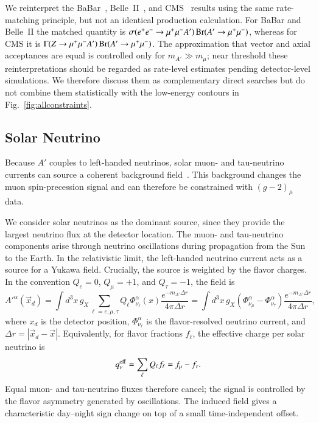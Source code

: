 \documentclass[onecolumn, aps, nofootinbib, prd, preprint, floats, floatfix, amsmath, amssymb, superscriptaddress, preprintnumbers]{revtex4-2}
\begin{document}
We reinterpret the BaBar~\cite{BaBar:2016sci}, Belle~II~\cite{Belle-II:2024wtd}, and CMS~\cite{CMS:2018yxg} results using the same rate-matching principle, but not an identical production calculation. For BaBar and Belle~II the matched quantity is $\sigma(e^+e^-\to\mu^+\mu^-A')\,{\rm Br}(A'\to\mu^+\mu^-)$, whereas for CMS it is $\Gamma(Z\to\mu^+\mu^-A')\,{\rm Br}(A'\to\mu^+\mu^-)$. The approximation that vector and axial acceptances are equal is controlled only for $m_{A'}\gg m_\mu$; near threshold these reinterpretations should be regarded as rate-level estimates pending detector-level simulations. We therefore discuss them as complementary direct searches but do not combine them statistically with the low-energy contours in Fig.~\ref{fig:allconstraints}.


\subsection{Solar Neutrino}
Because $A'$ couples to left-handed neutrinos, solar muon- and tau-neutrino currents can source a coherent background field~\cite{Fang:2025fvo}. This background changes the muon spin-precession signal and can therefore be constrained with $(g-2)_\mu$ data.

We consider solar neutrinos as the dominant source, since they provide the largest neutrino flux at the detector location. The muon- and tau-neutrino components arise through neutrino oscillations during propagation from the Sun to the Earth.
In the relativistic limit, the left-handed neutrino current acts as a source for a Yukawa field. Crucially, the source is weighted by the flavor charges. In the convention $Q_e=0$, $Q_\mu=+1$, and $Q_\tau=-1$, the field is
\begin{equation}
A'^{\alpha}(\vec{x}_d)
=\int d^3x\,g_X
\sum_{\ell=e,\mu,\tau}Q_\ell\Phi_{\nu_\ell}^{\alpha}(x)
\frac{e^{-m_{A'}\Delta r}}{4\pi\Delta r}
=\int d^3x\,g_X
\left(\Phi_{\nu_\mu}^{\alpha}-\Phi_{\nu_\tau}^{\alpha}\right)
\frac{e^{-m_{A'}\Delta r}}{4\pi\Delta r},
\label{eq:axial-vector-potential}
\end{equation}
where $x_d$ is the detector position, $\Phi_{\nu_\ell}^{\alpha}$ is the flavor-resolved neutrino current, and $\Delta r=|\vec{x}_d-\vec{x}|$. Equivalently, for flavor fractions $f_\ell$, the effective charge per solar neutrino is
\begin{equation}
q_\nu^{\rm eff}=\sum_\ell Q_\ell f_\ell=f_\mu-f_\tau.
\end{equation}
Equal muon- and tau-neutrino fluxes therefore cancel; the signal is controlled by the flavor asymmetry generated by oscillations. The induced field gives a characteristic day--night sign change on top of a small time-independent offset.
\end{document}
